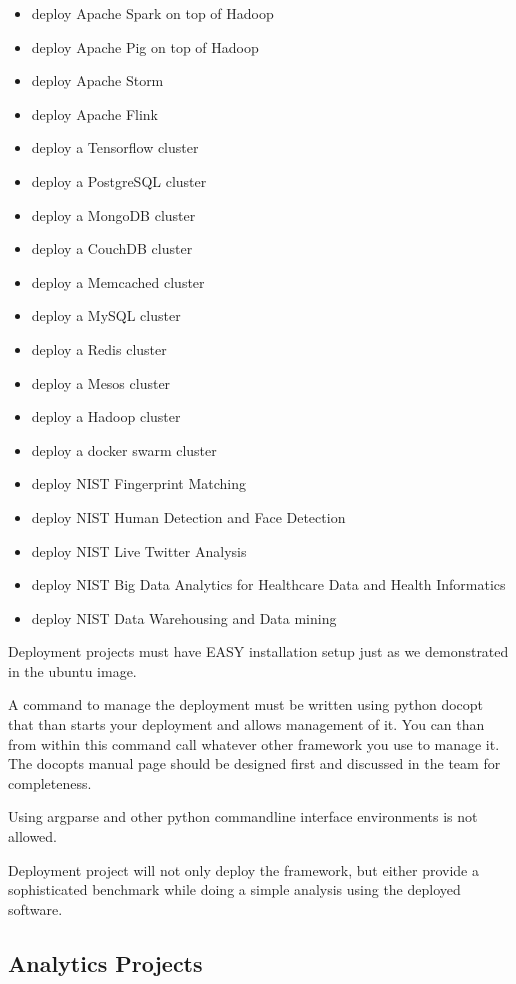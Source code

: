 \begin{itemize}

\item
  deploy Apache Spark on top of Hadoop
\item
  deploy Apache Pig on top of Hadoop
\item
  deploy Apache Storm
\item
  deploy Apache Flink
\item
  deploy a Tensorflow cluster
\item
  deploy a PostgreSQL cluster
\item
  deploy a MongoDB cluster
\item
  deploy a CouchDB cluster
\item
  deploy a Memcached cluster
\item
  deploy a MySQL cluster
\item
  deploy a Redis cluster
\item
  deploy a Mesos cluster
\item
  deploy a Hadoop cluster
\item
  deploy a docker swarm cluster
\item
  deploy NIST Fingerprint Matching
\item
  deploy NIST Human Detection and Face Detection
\item
  deploy NIST Live Twitter Analysis
\item
  deploy NIST Big Data Analytics for Healthcare Data and Health
  Informatics
\item
  deploy NIST Data Warehousing and Data mining
\end{itemize}

Deployment projects must have EASY installation setup just as we
demonstrated in the ubuntu image.

A command to manage the deployment must be written using python docopt
that than starts your deployment and allows management of it. You can
than from within this command call whatever other framework you use to
manage it. The docopts manual page should be designed first and
discussed in the team for completeness.

Using argparse and other python commandline interface environments is
not allowed.

Deployment project will not only deploy the framework, but either provide
a sophisticated benchmark while doing a simple analysis using the
deployed software.

\subsection{Analytics Projects}\label{analytics-projects}


